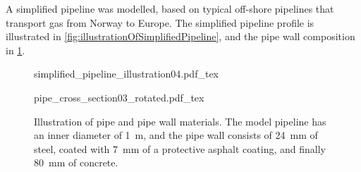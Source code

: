A simplified pipeline was modelled, based on typical off-shore pipelines that transport gas from Norway to Europe. The simplified pipeline profile is illustrated in \cref{fig:illustrationOfSimplifiedPipeline}, and the pipe wall composition in \cref{fig:pipeCrossSection}.



\begin{figure}[!ht]%
\centering%
\begin{minipage}{9.6cm}%
    {simplified_pipeline_illustration04.pdf_tex}%
    \\ %
    \parbox{0.9\textwidth}{%
        \vspace{2mm}%
        \caption{%
            Illustration of the simplified pipeline. The pipe is on-shore and buried 2~m underground for the first and last 25~km, and 100~m below sea level and exposed to sea water for 600~km between the on-shore sections. Figure created freely after figure in \cite{Helgaker2013Modeling}.%
            \label{fig:illustrationOfSimplifiedPipeline}%
        }%
    }%
\end{minipage}%
\hspace{0.099cm}%
\begin{minipage}{6.3cm}%
    {pipe_cross_section03_rotated.pdf_tex}%
    \caption{%
        Illustration of pipe and pipe wall materials. The model pipeline has an inner diameter of \SI{1}{\meter}, and the pipe wall consists of \SI{24}{mm} of steel, coated with \SI{7}{mm} of a protective asphalt coating, and finally \SI{80}{mm} of concrete.%
        \label{fig:pipeCrossSection}%
    }%
\end{minipage}%
\end{figure}

